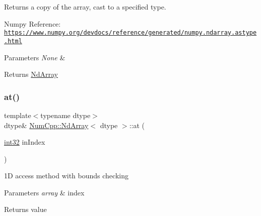 Returns a copy of the array, cast to a specified type.

Numpy Reference\+: \href{https://www.numpy.org/devdocs/reference/generated/numpy.ndarray.astype.html}{\tt https\+://www.\+numpy.\+org/devdocs/reference/generated/numpy.\+ndarray.\+astype.\+html}


\begin{DoxyParams}{Parameters}
{\em None} & \\
\hline
\end{DoxyParams}
\begin{DoxyReturn}{Returns}
\mbox{\hyperlink{class_num_cpp_1_1_nd_array}{Nd\+Array}} 
\end{DoxyReturn}
\mbox{\label{class_num_cpp_1_1_nd_array_ab219e7a4c6d4a30e0bc387f5ac4feb12}} 
\subsubsection{\texorpdfstring{at()}{at()}\hspace{0.1cm}{\footnotesize\ttfamily [1/8]}}
{\footnotesize\ttfamily template$<$typename dtype$>$ \\
dtype\& \mbox{\hyperlink{class_num_cpp_1_1_nd_array}{Num\+Cpp\+::\+Nd\+Array}}$<$ dtype $>$\+::at (\begin{DoxyParamCaption}\item[{\mbox{\hyperlink{namespace_num_cpp_acf3eb1592f8b248ff0a236634864633c}{int32}}}]{in\+Index }\end{DoxyParamCaption})\hspace{0.3cm}{\ttfamily [inline]}}

1D access method with bounds checking


\begin{DoxyParams}{Parameters}
{\em array} & index \\
\hline
\end{DoxyParams}
\begin{DoxyReturn}{Returns}
value 
\end{DoxyReturn}
\mbox{\label{class_num_cpp_1_1_nd_array_a27aa41696cef7b11549af3c8d6a5e3fd}} 
